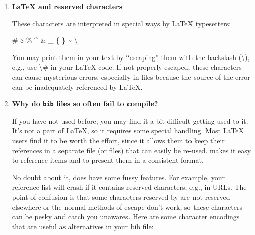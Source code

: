 \begin{enumerate}
\hspace{35pt} \verb+Dr.~Jones+

instead of simply

\hspace{35pt} \verb+Dr. Jones+

This is how to tell {\LaTeX} never to break a line after \verb+`Dr.'+ with
\verb+`Jones'+ starting at the beginning of the next line.

\item {\bf {\LaTeX} and {\BibTeX} reserved characters}

These characters are interpreted in special ways by {\LaTeX} typesetters: 
\vspace{5pt}

\centerline{\# \$ \% \^{} \& \_ \{ \} \~{} \textbackslash{}}

You may print them in your text by ``escaping'' them with the backslash (\textbackslash{}), e.g.,  use \textbackslash{}\# in your {\LaTeX} code.
If not properly escaped, these characters can cause mysterious errors, especially in {\BibTeX} files because the source of the error can be inadequately-referenced by {\LaTeX}.

\item {\bf Why do {\BibTeX} {\tt bib} files so often fail to compile?}

If you have not used {\BibTeX} before, you may find it a bit difficult getting used to it.
It's not a part of {\LaTeX}, so it requires some special handling.
Most {\LaTeX} users find it to be worth the effort, since it allows them to keep their references in a separate file (or files) that can easily be re-used.
{\BibTeX} makes it easy to reference items and to present them in a consistent format.

\hspace{15pt}No doubt about it, {\BibTeX} does have some fussy features.
For example, your reference list will crash if it contains reserved characters, e.g., in URLs.  The point of confusion is that some characters reserved by {\BibTeX} are not reserved elsewhere or the normal methods of escape don't work, so these characters can be pesky and catch you unawares.
Here are some character encodings that are useful as alternatives in your bib file:



\end{enumerate}
